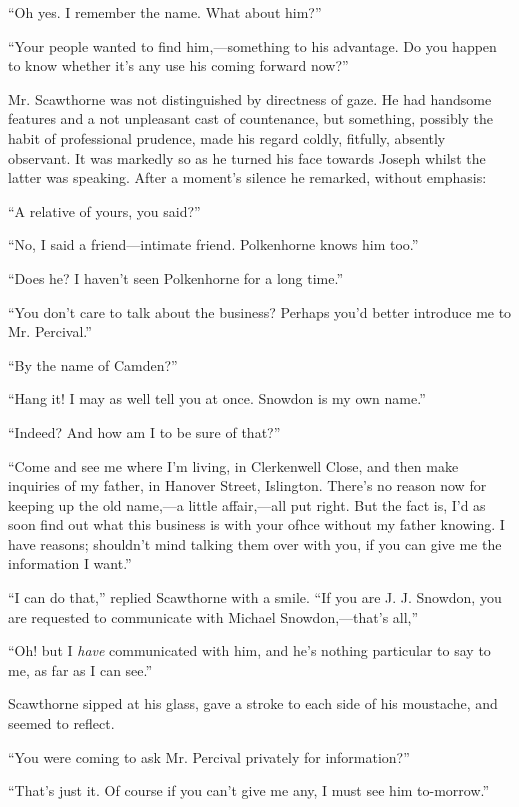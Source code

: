 {\protect\hypertarget{90}{}{}}``Oh yes. I remember the name. What about
him?''

``Your people wanted to find him,---something to his advantage. Do you
happen to know whether it's any use his coming forward now?''

Mr. Scawthorne was not distinguished by directness of gaze. He had
handsome features and a not unpleasant cast of countenance, but
something, possibly the habit of professional prudence, made his regard
coldly, fitfully, absently observant. It was markedly so as he turned
his face towards Joseph whilst the latter was speaking. After a moment's
silence he remarked, without emphasis:

``A relative of yours, you said?''

``No, I said a friend---intimate friend. Polkenhorne knows him too.''

``Does he? I haven't seen Polkenhorne for a long time.''

``You don't care to talk about the business? Perhaps you'd better
introduce me to Mr. Percival.''

``By the name of Camden?''

{\protect\hypertarget{91}{}{}}``Hang it! I may as well tell you at once.
Snowdon is my own name.''

``Indeed? And how am I to be sure of that?''

``Come and see me where I'm living, in Clerkenwell Close, and then make
inquiries of my father, in Hanover Street, Islington. There's no reason
now for keeping up the old name,---a little affair,---all put right. But
the fact is, I'd as soon find out what this business is with your ofhce
without my father knowing. I have reasons; shouldn't mind talking them
over with you, if you can give me the information I want.''

``I can do that,'' replied Scawthorne with a smile. ``If you are J. J.
Snowdon, you are requested to communicate with Michael Snowdon,---that's
all,''

``Oh! but I \emph{have} communicated with him, and he's nothing
particular to say to me, as far as I can see.''

Scawthorne sipped at his glass, gave a stroke to each side of his
moustache, and seemed to reflect.

{\protect\hypertarget{92}{}{}}``You were coming to ask Mr. Percival
privately for information?''

``That's just it. Of course if you can't give me any, I must see him
to-morrow.''

